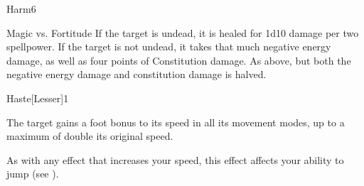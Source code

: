 \begin{spellsection}{Harm}{6}
    \begin{spellheader}
    \end{spellheader}
    \begin{spellcontent}
        \begin{spelltargetinginfo}
        \end{spelltargetinginfo}
        \begin{spelleffects}
            \begin{spellattack}{Magic vs. Fortitude}
                \spelleffect If the target is undead, it is healed for 1d10 damage per two spellpower.
                \spellsuccess If the target is not undead, it takes that much negative energy damage, as well as four points of Constitution damage.
                \spellfailure As above, but both the negative energy damage and constitution damage is halved.
            \end{spellattack}
        \end{spelleffects}
    \end{spellcontent}
    \begin{spellfooter}
        \miscastrandom
    \end{spellfooter}
\end{spellsection}

\begin{spellsection}{Haste}[Lesser]{1}
    \begin{spellheader}
    \end{spellheader}
    \begin{spellcontent}
        \begin{spelltargetinginfo}
        \end{spelltargetinginfo}
        \begin{spelleffects}
            \spelleffect The target gains a  foot bonus to its speed in all its movement modes, up to a maximum of double its original speed.
            \spelldur \durshort \dismissable
        \end{spelleffects}
    \end{spellcontent}
    \begin{spellfooter}
        \spellnotes As with any effect that increases your speed, this effect affects your ability to jump (see ).
        \miscastrandom
    \end{spellfooter}
\end{spellsection}

